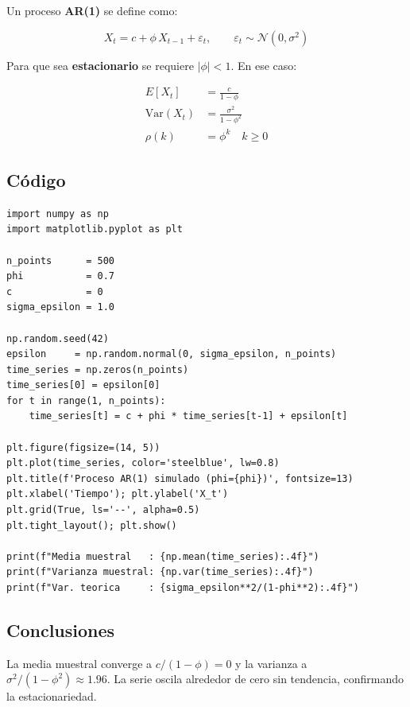 \documentclass[12pt,letterpaper]{article}
\begin{document}
Un proceso \textbf{AR(1)} se define como:

\begin{equation}
  X_t = c + \phi\,X_{t-1} + \varepsilon_t, \qquad \varepsilon_t \sim \mathcal{N}(0,\sigma^2)
\end{equation}

Para que sea \textbf{estacionario} se requiere $|\phi| < 1$. En ese caso:

\begin{align}
  E[X_t]           &= \frac{c}{1-\phi} \\
  \mathrm{Var}(X_t) &= \frac{\sigma^2}{1-\phi^2} \\
  \rho(k)           &= \phi^k \quad k \geq 0
\end{align}

\subsection{C\'odigo}

\begin{lstlisting}[style=python, caption={Simulaci\'on AR(1) estacionario}]
import numpy as np
import matplotlib.pyplot as plt

n_points      = 500
phi           = 0.7
c             = 0
sigma_epsilon = 1.0

np.random.seed(42)
epsilon     = np.random.normal(0, sigma_epsilon, n_points)
time_series = np.zeros(n_points)
time_series[0] = epsilon[0]
for t in range(1, n_points):
    time_series[t] = c + phi * time_series[t-1] + epsilon[t]

plt.figure(figsize=(14, 5))
plt.plot(time_series, color='steelblue', lw=0.8)
plt.title(f'Proceso AR(1) simulado (phi={phi})', fontsize=13)
plt.xlabel('Tiempo'); plt.ylabel('X_t')
plt.grid(True, ls='--', alpha=0.5)
plt.tight_layout(); plt.show()

print(f"Media muestral   : {np.mean(time_series):.4f}")
print(f"Varianza muestral: {np.var(time_series):.4f}")
print(f"Var. teorica     : {sigma_epsilon**2/(1-phi**2):.4f}")
\end{lstlisting}

\subsection{Conclusiones}

La media muestral converge a $c/(1-\phi)=0$ y la varianza a
$\sigma^2/(1-\phi^2) \approx 1.96$. La serie oscila alrededor de cero sin
tendencia, confirmando la estacionariedad.
\end{document}
